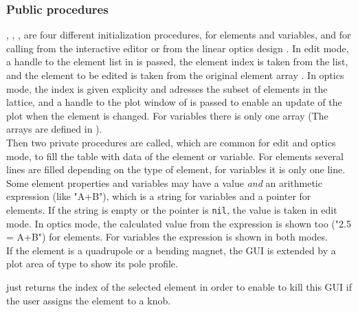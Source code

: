 \documentclass[12pt]{article}
\newcommand\code[1]{{\tt #1}}
\newcommand\guico[1]{{\color{blue}\code{#1}}}
\newcommand{\unico}[1]{{\color{burntorange}\code{#1}}}
\newcommand{\opagui}[1]{\colorbox{blue!20}{{\color{black}\code{#1}}}}
\newcommand{\ogui}[1]{\hyperref[#1]{\opagui{#1}}}
\newcommand{\opaguif}[1]{\colorbox{violet!30}{{\color{black}\code{#1}}}}
\newcommand{\oguif}[1]{\hyperref[#1]{\opaguif{#1}}}
\newcommand{\opauni}[1]{\colorbox{orange!30}{{\color{black}\code{#1}}}}
\newcommand{\ouni}[1]{\hyperref[#1]{\opauni{#1}}}
\newcommand{\ppro}[1]{\subsubsection*{Public procedures} #1}
\begin{document}
\ppro{
\guico{InitE}, \guico{InitEVar}, \guico{InitO},  \guico{InitOVar} are four different initialization procedures, for elements and variables, and for calling from the interactive editor \ogui{opaeditor} or from the linear optics design \ogui{opalinop}. In edit mode, a handle to the element list in \ogui{opamenu} is passed, the element index is taken from the list, and the element to be edited is taken from the original element array \unico{Elem}. In optics mode, the index is given explicity and adresses the \unico{Ella} subset of elements in the lattice, and a handle to the plot window of \ogui{opalinop} is passed to enable an update of the plot when the element is changed. For variables there is only one array \unico{Variable} (The arrays are defined in \ouni{globlib}). \\
Then two private procedures are called, which are common for edit and optics mode, to fill the table with data of the element or variable. For elements several lines are filled depending on the type of element, for variables it is only one line. Some element properties and variables may have a value {\em and} an arithmetic expression (like "A+B"), which is a string for variables and a pointer for elements. If the string is empty or the pointer is \code{nil}, the value is taken in edit mode. In optics mode, the calculated value from the expression is shown too ("2.5 = A+B") for elements. For variables the expression is shown in both modes.\\
If the element is a quadrupole or a bending magnet, the GUI is extended by a plot area of type \oguif{../com/asfigure} to show its pole profile.

\guico{getJelem} just returns the index of the selected element in order to enable \ogui{opalinop} to kill this GUI if the user assigns the element to a knob.
}
\end{document}
